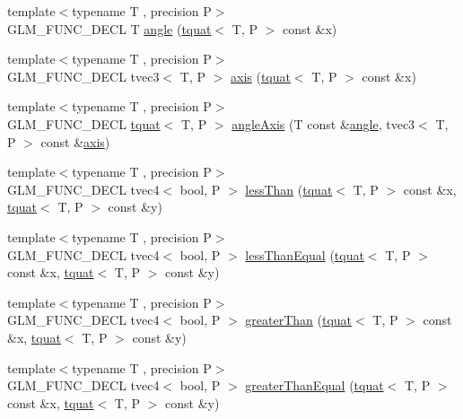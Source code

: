 \begin{DoxyCompactItemize}
\item 
{\footnotesize template$<$typename T , precision P$>$ }\\G\+L\+M\+\_\+\+F\+U\+N\+C\+\_\+\+D\+E\+C\+L T \hyperlink{group__gtc__quaternion_gad4a4448baedb198b2b1e7880d2544dc9}{angle} (\hyperlink{structglm_1_1tquat}{tquat}$<$ T, P $>$ const \&x)
\item 
{\footnotesize template$<$typename T , precision P$>$ }\\G\+L\+M\+\_\+\+F\+U\+N\+C\+\_\+\+D\+E\+C\+L tvec3$<$ T, P $>$ \hyperlink{group__gtc__quaternion_ga0b3e87a13b2708154b72259e50789a19}{axis} (\hyperlink{structglm_1_1tquat}{tquat}$<$ T, P $>$ const \&x)
\item 
{\footnotesize template$<$typename T , precision P$>$ }\\G\+L\+M\+\_\+\+F\+U\+N\+C\+\_\+\+D\+E\+C\+L \hyperlink{structglm_1_1tquat}{tquat}$<$ T, P $>$ \hyperlink{group__gtc__quaternion_ga37ae19405f1ccf766f27e4fcd035d859}{angle\+Axis} (T const \&\hyperlink{group__gtc__quaternion_gad4a4448baedb198b2b1e7880d2544dc9}{angle}, tvec3$<$ T, P $>$ const \&\hyperlink{group__gtc__quaternion_ga0b3e87a13b2708154b72259e50789a19}{axis})
\item 
{\footnotesize template$<$typename T , precision P$>$ }\\G\+L\+M\+\_\+\+F\+U\+N\+C\+\_\+\+D\+E\+C\+L tvec4$<$ bool, P $>$ \hyperlink{group__gtc__quaternion_ga91a40d16a3b5bb47d71ac1a3fb688ffa}{less\+Than} (\hyperlink{structglm_1_1tquat}{tquat}$<$ T, P $>$ const \&x, \hyperlink{structglm_1_1tquat}{tquat}$<$ T, P $>$ const \&y)
\item 
{\footnotesize template$<$typename T , precision P$>$ }\\G\+L\+M\+\_\+\+F\+U\+N\+C\+\_\+\+D\+E\+C\+L tvec4$<$ bool, P $>$ \hyperlink{group__gtc__quaternion_ga7c81996ed2724f26fe76faf352c76294}{less\+Than\+Equal} (\hyperlink{structglm_1_1tquat}{tquat}$<$ T, P $>$ const \&x, \hyperlink{structglm_1_1tquat}{tquat}$<$ T, P $>$ const \&y)
\item 
{\footnotesize template$<$typename T , precision P$>$ }\\G\+L\+M\+\_\+\+F\+U\+N\+C\+\_\+\+D\+E\+C\+L tvec4$<$ bool, P $>$ \hyperlink{group__gtc__quaternion_ga09d21a588ae425ac7517ea65cc59a5ae}{greater\+Than} (\hyperlink{structglm_1_1tquat}{tquat}$<$ T, P $>$ const \&x, \hyperlink{structglm_1_1tquat}{tquat}$<$ T, P $>$ const \&y)
\item 
{\footnotesize template$<$typename T , precision P$>$ }\\G\+L\+M\+\_\+\+F\+U\+N\+C\+\_\+\+D\+E\+C\+L tvec4$<$ bool, P $>$ \hyperlink{group__gtc__quaternion_ga0906a221a2037519fcf316ea5c1e3b3e}{greater\+Than\+Equal} (\hyperlink{structglm_1_1tquat}{tquat}$<$ T, P $>$ const \&x, \hyperlink{structglm_1_1tquat}{tquat}$<$ T, P $>$ const \&y)

\end{DoxyCompactItemize}
